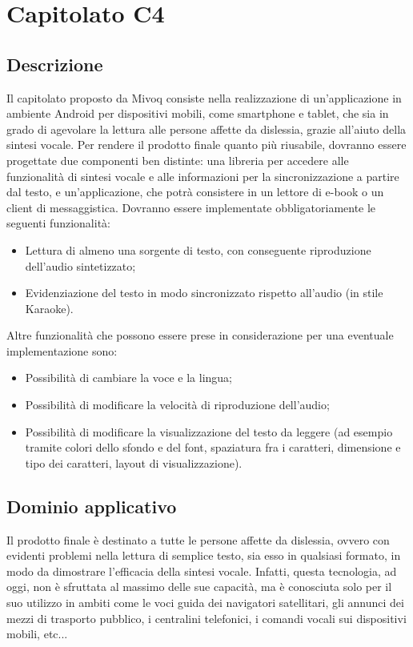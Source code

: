 \newpage
\section{Capitolato C4}

\subsection{Descrizione}

Il capitolato proposto da Mivoq consiste nella realizzazione di un'applicazione
in ambiente Android per dispositivi mobili, come smartphone e tablet,
che sia in grado di agevolare la lettura alle persone affette da dislessia,
grazie all'aiuto della sintesi vocale. Per rendere il prodotto finale
quanto più riusabile, dovranno essere progettate due componenti ben
distinte: una libreria per accedere alle funzionalità di sintesi vocale
e alle informazioni per la sincronizzazione a partire dal testo, e
un'applicazione, che potrà consistere in un lettore di e-book o un
client di messaggistica. Dovranno essere implementate obbligatoriamente
le seguenti funzionalità: 

\begin{itemize}
	\item Lettura di almeno una sorgente di testo,
	con conseguente riproduzione dell'audio sintetizzato;
	\item Evidenziazione
	del testo in modo sincronizzato rispetto all'audio (in stile Karaoke).
\end{itemize}

Altre funzionalità che possono essere prese in considerazione per
una eventuale implementazione sono: 

\begin{itemize}
	\item Possibilità di cambiare la voce e la lingua;
	\item Possibilità di modificare la velocità di riproduzione dell'audio;
	\item Possibilità di modificare la visualizzazione del testo da leggere (ad esempio tramite colori dello sfondo e del font, spaziatura fra i caratteri, dimensione e tipo dei caratteri, layout di visualizzazione).
\end{itemize}

\subsection{Dominio applicativo}

Il prodotto finale è destinato a tutte le persone affette da dislessia,
ovvero con evidenti problemi nella lettura di semplice testo, sia
esso in qualsiasi formato, in modo da dimostrare l'efficacia della
sintesi vocale. Infatti, questa tecnologia, ad oggi, non è sfruttata
al massimo delle sue capacità, ma è conosciuta solo per il suo utilizzo
in ambiti come le voci guida dei navigatori satellitari, gli annunci
dei mezzi di trasporto pubblico, i centralini telefonici, i comandi
vocali sui dispositivi mobili, etc...

